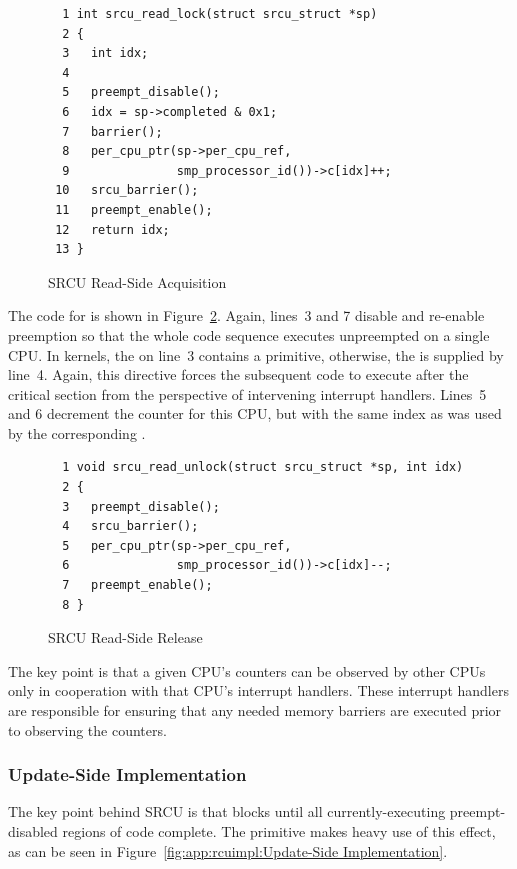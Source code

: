 \begin{figure}[htbp]
{ \scriptsize
\begin{verbatim}
  1 int srcu_read_lock(struct srcu_struct *sp)
  2 {
  3   int idx;
  4
  5   preempt_disable();
  6   idx = sp->completed & 0x1;
  7   barrier();
  8   per_cpu_ptr(sp->per_cpu_ref,
  9               smp_processor_id())->c[idx]++;
 10   srcu_barrier();
 11   preempt_enable();
 12   return idx;
 13 }
\end{verbatim}
}
\caption{SRCU Read-Side Acquisition}
\label{fig:app:rcuimpl:Read-Side Acquisition}
\end{figure}

The code for  is shown in
Figure~\ref{fig:app:rcuimpl:Read-Side Release}.
Again, lines~3 and 7 disable and re-enable preemption so that the
whole code sequence executes unpreempted on a single CPU.
In  kernels, the  on line~3
contains a  primitive, otherwise, the 
is supplied by line~4.
Again, this directive forces the subsequent code to execute after
the critical section from the perspective of intervening
interrupt handlers.
Lines~5 and 6 decrement the counter for this CPU, but with the same
index as was used by the corresponding .

\begin{figure}[htbp]
{ \scriptsize
\begin{verbatim}
  1 void srcu_read_unlock(struct srcu_struct *sp, int idx)
  2 {
  3   preempt_disable();
  4   srcu_barrier();
  5   per_cpu_ptr(sp->per_cpu_ref,
  6               smp_processor_id())->c[idx]--;
  7   preempt_enable();
  8 }
\end{verbatim}
}
\caption{SRCU Read-Side Release}
\label{fig:app:rcuimpl:Read-Side Release}
\end{figure}

The key point is that a given CPU's counters
can be observed by other CPUs only in
cooperation with that CPU's interrupt handlers.
These interrupt handlers are responsible for ensuring that any needed
memory barriers are executed prior to observing the counters.

\subsubsection{Update-Side Implementation}
\label{sec:app:rcuimpl:Update-Side Implementation}

The key point behind SRCU is that 
blocks until all currently-executing preempt-disabled regions of
code complete.
The  primitive makes heavy use of this effect,
as can be seen in
Figure~\ref{fig:app:rcuimpl:Update-Side Implementation}.


